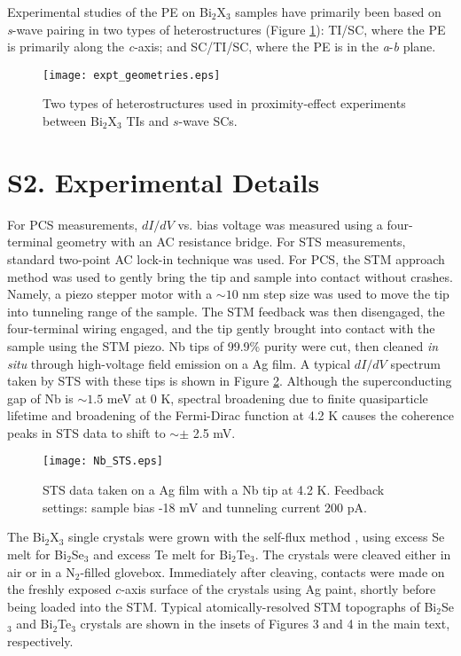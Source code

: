 \documentclass[aps,prl,onecolumn,notitlepage,reprintnumbers,amsmath,amssymb,superscriptaddress,citeautoscript]{revtex4-1}
\begin{document}
Experimental studies of the PE on Bi$_{2}$X$_{3}$ samples have primarily been based on \textit{s}-wave pairing in two types of heterostructures (Figure \ref{fig:geometries}): TI/SC, where the PE is primarily along the \textit{c}-axis; and SC/TI/SC, where the PE is in the \textit{a}-\textit{b} plane.

\begin{figure}[ht]
\texttt{[image: expt\_geometries.eps]}
\caption{\label{fig:geometries} Two types of heterostructures used in proximity-effect experiments between Bi$_{2}$X$_{3}$ TIs and $s$-wave SCs.}
\end{figure}



\section{S2. Experimental Details}

For PCS measurements, $dI/dV$  vs. bias voltage was measured using a four-terminal geometry with an AC resistance bridge. For STS measurements, standard two-point AC lock-in technique was used. For PCS, the STM approach method was used to gently bring the tip and sample into contact without crashes. Namely, a piezo stepper motor with a $\sim10$ nm step size was used to move the tip into tunneling range of the sample. The STM feedback was then disengaged, the four-terminal wiring engaged, and the tip gently brought into contact with the sample using the STM piezo.   Nb tips of 99.9\% purity were cut, then cleaned \textit{in situ} through high-voltage field emission on a Ag film. A typical $dI/dV$ spectrum taken by STS with these tips is shown in Figure \ref{fig:NbSTS}. Although the superconducting gap of Nb is $\sim1.5$ meV at 0 K, spectral broadening due to finite quasiparticle lifetime and broadening of the Fermi-Dirac function at 4.2 K causes the coherence peaks in STS data to shift to $\sim\pm$ 2.5 mV.

\newpage

\begin{figure}[ht]
\texttt{[image: Nb\_STS.eps]}
\caption{\label{fig:NbSTS} STS data taken on a Ag film with a Nb tip at 4.2 K. Feedback settings: sample bias -18 mV and tunneling current 200 pA.}
\end{figure}


The Bi$_{2}$X$_{3}$ single crystals were grown with the self-flux method \cite{Fisk1989}, using excess Se melt for Bi$_{2}$Se$_{3}$ and excess Te melt for Bi$_{2}$Te$_{3}$. The crystals were cleaved either in air or in a N$_{2}$-filled glovebox. Immediately after cleaving, contacts were made on the freshly exposed $c$-axis surface of the crystals using Ag paint, shortly before being loaded into the STM. Typical atomically-resolved STM topographs of Bi$_{2}$Se$_{3}$ and Bi$_{2}$Te$_{3}$ crystals are shown in the insets of Figures 3 and 4 in the main text, respectively. 
\end{document}
